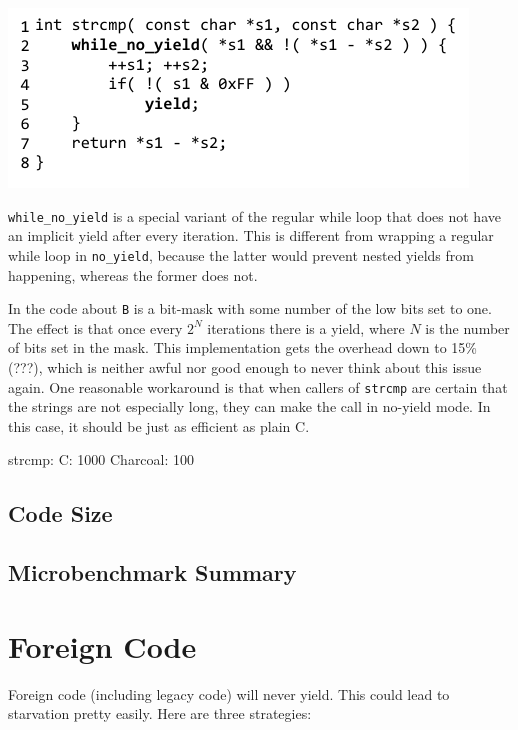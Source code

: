 \documentclass[10pt,preprint]{sigplanconf}
\begin{document}
{\raggedleft \includegraphics{strcmp_benchmark}}

\texttt{while\_no\_yield} is a special variant of the regular while loop that does not have an implicit yield after every iteration.
This is different from wrapping a regular while loop in \texttt{no\_yield}, because the latter would prevent nested yields from happening, whereas the former does not.

In the code about \texttt{B} is a bit-mask with some number of the low bits set to one.
The effect is that once every $2^N$ iterations there is a yield, where $N$ is the number of bits set in the mask.
This implementation gets the overhead down to 15\% (???), which is neither awful nor good enough to never think about this issue again.
One reasonable workaround is that when callers of \texttt{strcmp} are certain that the strings are not especially long, they can make the call in no-yield mode.
In this case, it should be just as efficient as plain C.

strcmp: C: 1000 Charcoal: 100

\subsection{Code Size}

\subsection{Microbenchmark Summary}

\section{Foreign Code}

Foreign code (including legacy code) will never yield.  This could lead
to starvation pretty easily.  Here are three strategies:
\end{document}
